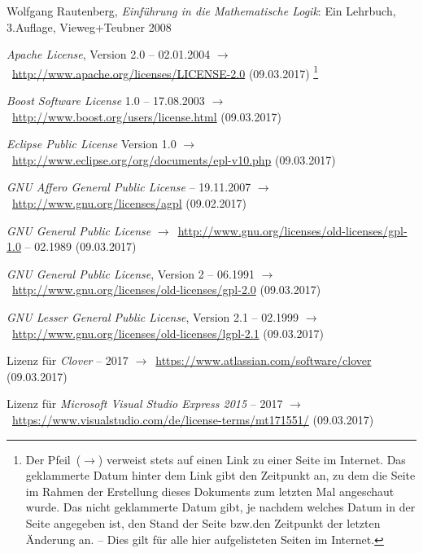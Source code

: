 \documentclass[english,ngerman,parskip=half,headsepline,footsepline,
	fleqn,notitlepage]{scrreprt}
\makeatletter
\newcommand*{\texthead}[1]{\textnormal{\textsf{\textbf{#1}}}}%
\newcommand*{\Chead}[1]{\chead{\texthead{#1}}}
\newcommand*{\Ihead}[1]{\ihead{\texthead{#1}}}
\newcommand*{\Pagestyle}{\pagestyle{scrheadings}}
\newcommand*{\Thispagestyle}{\thispagestyle{scrheadings}}
\newcommand*{\bibdictionary}[1]{%
	\Chead{#1}%
	\Ihead{}%
	\Pagestyle%
}
\newcommand*{\beginbibdictionary}[1]{%
	\Thispagestyle%
	\addcontentsline{toc}{section}{#1}%
}
\newcommand*{\tourl}[1]{$\rightarrow$~\url{#1}}
\newcommand*{\textbzw}{bzw.\@ }
\makeatother
\begin{document}
	\bibdictionary{\bibname}%
	\begin{flushleft}
		\begin{thebibliography}{12}
			\beginbibdictionary{\bibname}    %
			\label{dic:Literaturverzeichnis} %

			Wolfgang Rautenberg,
			\emph{Einführung in die Mathematische Logik}:
			Ein Lehrbuch, 3.\@ Auflage, Vieweg+Teubner 2008

			\emph{Apache License}, Version 2.0
			-- 02.01.2004
			\tourl{http://www.apache.org/licenses/LICENSE-2.0} (09.03.2017)%
			\footnote{%
				Der Pfeil~($\rightarrow$)
				verweist stets auf einen Link zu einer Seite im Internet.
				Das geklammerte Datum hinter dem Link gibt den Zeitpunkt an,
				zu dem die Seite im Rahmen der Erstellung dieses Dokuments
				zum letzten Mal angeschaut wurde.
				Das nicht geklammerte Datum gibt,
				je nachdem welches Datum in der Seite angegeben ist,
				den Stand der Seite
				\textbzw den Zeitpunkt der letzten Änderung an.
				-- Dies gilt für alle hier aufgelisteten Seiten im Internet.%
			}

			\emph{Boost Software License} 1.0 -- 17.08.2003
			\tourl{http://www.boost.org/users/license.html}
			(09.03.2017)

			\emph{Eclipse Public License} Version 1.0
			\tourl{http://www.eclipse.org/org/documents/epl-v10.php}
			(09.03.2017)

			\emph{GNU Affero General Public License}
			-- 19.11.2007
			\tourl{http://www.gnu.org/licenses/agpl}
			(09.02.2017)

			\emph{GNU General Public License}
			\tourl{http://www.gnu.org/licenses/old-licenses/gpl-1.0}
			-- 02.1989 (09.03.2017)

			\emph{GNU General Public License}, Version 2
			-- 06.1991
			\tourl{http://www.gnu.org/licenses/old-licenses/gpl-2.0}
			(09.03.2017)

			\emph{GNU Lesser General Public License},
			Version 2.1 -- 02.1999
			\tourl{http://www.gnu.org/licenses/old-licenses/lgpl-2.1}
			(09.03.2017)

			Lizenz für \emph{Clover}
			-- 2017
			\tourl{https://www.atlassian.com/software/clover}
			(09.03.2017)

			Lizenz
			für \emph{Microsoft Visual Studio Express 2015}
			-- 2017
			\tourl{https://www.visualstudio.com/de/license-terms/mt171551/}
			(09.03.2017)


\end{thebibliography}
\end{flushleft}
\end{document}

